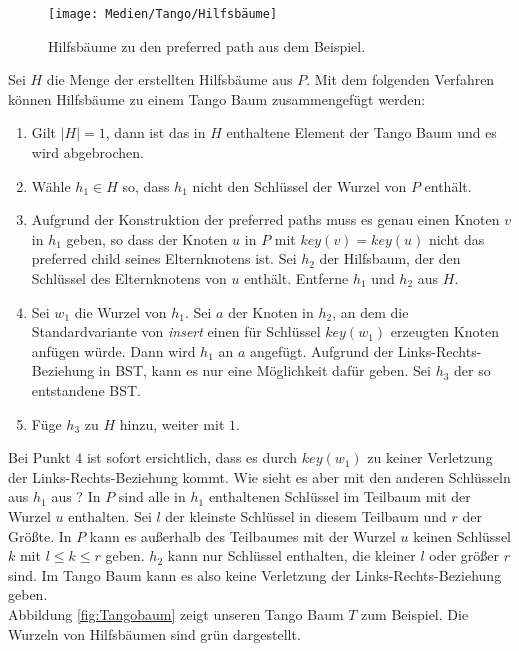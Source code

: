\documentclass[a4paper,12pt]{article}
\begin{document}
\begin{figure}[H]
	\centering
	\texttt{[image: Medien/Tango/Hilfsbäume]}
	\caption{Hilfsbäume zu den preferred path aus dem Beispiel. }
	\label{fig:Hilfsbäume}
\end{figure}
\noindent Sei $H$ die Menge der erstellten Hilfsbäume aus $P$. Mit dem folgenden Verfahren können Hilfsbäume zu einem Tango Baum zusammengefügt werden:
\begin{enumerate}
	\item Gilt $\vert H \vert = 1$, dann ist das in $H$ enthaltene Element der Tango Baum und es wird abgebrochen.
	\item Wähle $h_1 \in H$ so, dass $h_1$ nicht den Schlüssel der Wurzel von $P$ enthält.
	\item Aufgrund der Konstruktion der preferred paths muss es genau einen Knoten $v$ in $h_1$ geben, so dass der Knoten $u$ in $P$ mit $\mathit{key}\left(v\right) = \mathit{key}\left(u\right) $ nicht das preferred child seines Elternknotens ist.
	Sei $h_2$ der Hilfsbaum, der den Schlüssel des Elternknotens von $u$ enthält. Entferne $h_1$ und $h_2$ aus $H$.
	\item Sei $w_1$ die Wurzel von $h_1$. Sei $a$ der Knoten in $h_2$, an dem die Standardvariante von \textit{insert} einen für Schlüssel  $\mathit{key\left(w_1\right)}$ erzeugten Knoten anfügen würde. Dann wird $h_1$ an $a$ angefügt. Aufgrund der Links-Rechts-Beziehung in BST, kann es nur eine Möglichkeit dafür geben. Sei $h_3$ der so entstandene BST.
	\item Füge $h_3$ zu $H$ hinzu, weiter mit $1$.
\end{enumerate}

\noindent Bei Punkt $4$ ist sofort ersichtlich, dass es durch $\mathit{key}\left(w_1\right)$ zu keiner Verletzung der Links-Rechts-Beziehung kommt. Wie sieht es aber mit den anderen Schlüsseln aus $h_1$ aus ? 
In $P$ sind alle in $h_1$ enthaltenen Schlüssel im Teilbaum mit der Wurzel $u$ enthalten. Sei $l$ der kleinste Schlüssel in diesem Teilbaum und $r$ der Größte. In $P$ kann es außerhalb des Teilbaumes mit der Wurzel $u$ keinen Schlüssel $k$ mit $l \leq k \leq r$ geben. $h_2$ kann nur Schlüssel enthalten, die kleiner $l$ oder größer $r$ sind. Im Tango Baum kann es also keine Verletzung der Links-Rechts-Beziehung geben.\\


\noindent Abbildung \ref{fig:Tangobaum} zeigt unseren Tango Baum $T$ zum Beispiel. Die Wurzeln von Hilfsbäumen sind grün dargestellt.
\end{document}
